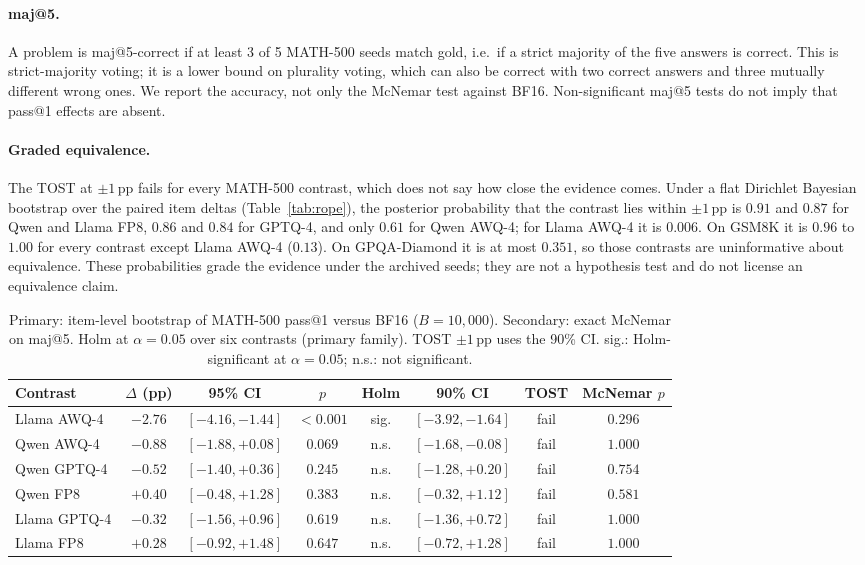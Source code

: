 \documentclass[11pt,a4paper]{article}
\begin{document}
\paragraph{maj@5.}
A problem is maj@5-correct if at least 3 of 5 MATH-500 seeds match gold, i.e.\ if a strict majority of the five answers is correct. This is strict-majority voting; it is a lower bound on plurality voting, which can also be correct with two correct answers and three mutually different wrong ones. We report the accuracy, not only the McNemar test against BF16. Non-significant maj@5 tests do not imply that pass@1 effects are absent.

\paragraph{Graded equivalence.} The TOST at $\pm 1$\,pp fails for every MATH-500 contrast, which does not say how close the evidence comes. Under a flat Dirichlet Bayesian bootstrap over the paired item deltas (Table~\ref{tab:rope}), the posterior probability that the contrast lies within $\pm 1$\,pp is $0.91$ and $0.87$ for Qwen and Llama FP8, $0.86$ and $0.84$ for GPTQ-4, and only $0.61$ for Qwen AWQ-4; for Llama AWQ-4 it is $0.006$. On GSM8K it is $0.96$ to $1.00$ for every contrast except Llama AWQ-4 ($0.13$). On GPQA-Diamond it is at most $0.351$, so those contrasts are uninformative about equivalence. These probabilities grade the evidence under the archived seeds; they are not a hypothesis test and do not license an equivalence claim.

\begin{table}[!htbp]
\centering
\caption{Primary: item-level bootstrap of MATH-500 pass@1 versus BF16 ($B=10{,}000$). Secondary: exact McNemar on maj@5. Holm at $\alpha=0.05$ over six contrasts (primary family). TOST $\pm 1$\,pp uses the 90\% CI. sig.: Holm-significant at $\alpha=0.05$; n.s.: not significant.}
\label{tab:pass1}
\small
\setlength{\tabcolsep}{4.75pt}
\begin{tabular}{lccccccc}
\toprule
\textbf{Contrast} & $\Delta$ (pp) & \textbf{95\% CI} & $p$ & \textbf{Holm} & \textbf{90\% CI} & \textbf{TOST} & \textbf{McNemar $p$} \\
\midrule
Llama AWQ-4  & $-2.76$ & $[-4.16,-1.44]$ & $<0.001$ & sig. & $[-3.92,-1.64]$ & fail & $0.296$ \\
Qwen AWQ-4   & $-0.88$ & $[-1.88,+0.08]$ & $0.069$ & n.s. & $[-1.68,-0.08]$ & fail & $1.000$ \\
Qwen GPTQ-4  & $-0.52$ & $[-1.40,+0.36]$ & $0.245$ & n.s. & $[-1.28,+0.20]$ & fail & $0.754$ \\
Qwen FP8     & $+0.40$ & $[-0.48,+1.28]$ & $0.383$ & n.s. & $[-0.32,+1.12]$ & fail & $0.581$ \\
Llama GPTQ-4 & $-0.32$ & $[-1.56,+0.96]$ & $0.619$ & n.s. & $[-1.36,+0.72]$ & fail & $1.000$ \\
Llama FP8    & $+0.28$ & $[-0.92,+1.48]$ & $0.647$ & n.s. & $[-0.72,+1.28]$ & fail & $1.000$ \\
\bottomrule
\end{tabular}
\end{table}
\end{document}
